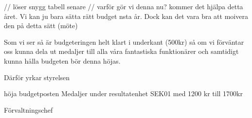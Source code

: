 \documentclass[../_main/handlingar.tex]{subfiles}
\begin{document}


// löser snygg tabell senare
// varför gör vi denna nu? kommer det hjälpa detta året. Vi kan ju bara sätta rätt budget nsta år. Dock kan det vara bra att moivera den på detta sätt (möte)


Som vi ser så är budgeteringen helt klart i underkant (500kr) så om vi förväntar oss kunna dela ut medaljer till alla våra fantastiska funktionärer och samtidigt kunna hålla budgeten bör denna höjas.

Därför yrkar styrelsen

\begin{attsatser}
  \att höja budgetposten Medaljer under resultatenhet SEK01 med 1200 kr till 1700kr
  
\end{attsatser}

\begin{signatures}{1}
    \ist
    \signature{\fvc}{Förvaltningschef}
\end{signatures}
\end{document}
